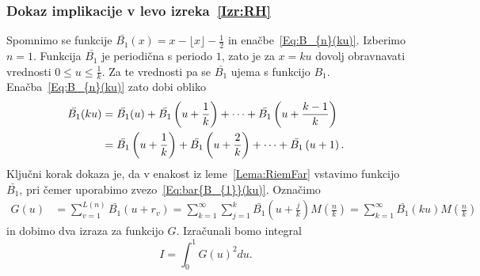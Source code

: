 \documentclass[mat1]{fmfdelo}
\begin{document}
\subsubsection{Dokaz implikacije v levo izreka~\ref{Izr:RH}}
Spomnimo se funkcije $ \bar{B_{1}}(x) = x - \lfloor x \rfloor - \frac{1}{2} $ in enačbe~\eqref{Eq:B_{n}(ku)}. Izberimo $n=1$. Funkcija $\bar{B_{1}}$ je periodična s periodo $1$, zato je za $x=ku$ dovolj obravnavati vrednosti $0 \leq u \leq \frac{1}{k}$. Za te vrednosti pa se $\bar{B_{1}}$ ujema s funkcijo $B_{1}$. Enačba~\eqref{Eq:B_{n}(ku)} zato dobi obliko
\begin{align}
\label{Eq:bar{B_{1}}(ku)}
\bar{B_{1}}(ku) &= \bar{B_{1}}(u) + \bar{B_{1}} \left( u + \frac{1}{k} \right) + \cdots + \bar{B_{1}} \left( u + \frac{k-1}{k} \right) \nonumber \\
			&= \bar{B_{1}} \left( u + \frac{1}{k} \right) + \bar{B_{1}} \left( u + \frac{2}{k} \right) + \cdots + \bar{B_{1}} \left( u + 1 \right).
\end{align}
%
Ključni korak dokaza je, da v enakost iz leme~\ref{Lema:RiemFar} vstavimo funkcijo $ \bar{B_{1}}$, pri čemer uporabimo zvezo~\eqref{Eq:bar{B_{1}}(ku)}. Označimo
\begin{align}
G(u) &= \sum_{v=1}^{L(n)} \bar{B_{1}}(u+r_v) = \sum_{k=1}^{\infty} \sum_{j=1}^{k} \bar{B_{1}} \left(u + \frac{j}{k} \right) M \left(\frac{n}{k} \right)
	= \sum_{k=1}^{\infty} \bar{B_{1}}(ku) M \left(\frac{n}{k} \right)
\end{align}
in dobimo dva izraza za funkcijo $G$. Izračunali bomo integral 
\begin{equation}
I = \int_{0}^1 G(u)^2 du.
\end{equation}
\end{document}
